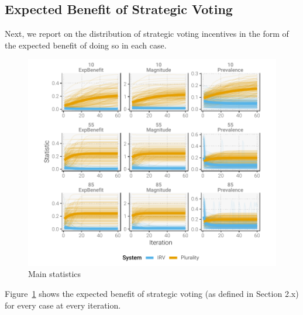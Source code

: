 \documentclass[12pt, letter]{article}
\begin{document}



\subsection{Expected Benefit of Strategic Voting}

Next, we report on the distribution of strategic voting incentives in the form of the expected benefit of doing so in each case.

\begin{figure}[]
	\centering
	\includegraphics[width = \textwidth]{../output/figures/iterated_complete}
	\caption{Main statistics}
	\label{fig:main_stats}
\end{figure}

Figure~\ref{fig:main_stats} shows the expected benefit of strategic voting (as defined in Section 2.x) for every case at every iteration. 
\end{document}
